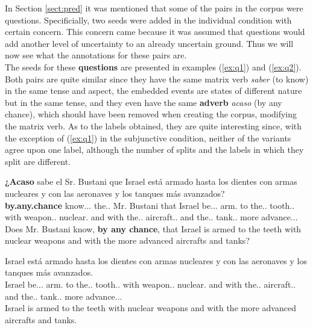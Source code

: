 In Section \ref{sect:pred} it was mentioned that some of the pairs in the corpus were questions. Specificially, two seeds were added in the individual condition with certain concern. This concern came because it was assumed that questions would add another level of uncertainty to an already uncertain ground. Thus we will now see what the annotations for these pairs are.\\ 

The seeds for these \textbf{questions} are presented in examples (\ref{ex:q1}) and (\ref{ex:q2}). Both pairs are quite similar since they have the same matrix verb \textit{saber} (to know) in the same tense and aspect, the embedded events are states of different nature but in the same tense, and they even have the same \textbf{adverb} \textit{acaso} (by any chance), which should have been removed when creating the corpus, modifying the matrix verb. As to the labels obtained, they are quite interesting since, with the exception of (\ref{ex:q1}) in the subjunctive condition, neither of the variants agree upon one label, although the number of splits and the labels in which they split are different.\\

\begin{exe}
  \ex\label{ex:q1}
    \begin{xlist}
      \item{\gll \textbf{¿Acaso} sabe el Sr. Bustani que Israel está armado hasta los dientes con armas nucleares y con las aeronaves y los tanques más avanzados?\\ \textbf{by.any.chance} know.\Prs.\Ind.\Tsg{} the.\M.\Sg{} Mr. Bustani that Israel be.\Prs.\Ind.\Tsg{} arm.\Ptcp{} to the.\M.\Pl{} tooth.\M.\Pl{} with weapon.\F.\Sg{} nuclear.\Pl{} and with the.\F.\Pl{} aircraft.\F.\Pl{} and the.\M.\Pl{} tank.\M.\Pl{} more advance.\Ptcp.\M.\Pl{} \\\glt Does Mr. Bustani know, \textbf{by any chance}, that Israel is armed to the teeth with nuclear weapons and with the more advanced aircrafts and tanks?}
      \item{\gll Israel está armado hasta los dientes con armas nucleares y con las aeronaves y los tanques más avanzados.\\ Israel be.\Prs.\Ind.\Tsg{} arm.\Ptcp{} to the.\M.\Pl{} tooth.\M.\Pl{} with weapon.\F.\Sg{} nuclear.\Pl{} and with the.\F.\Pl{} aircraft.\F.\Pl{} and the.\M.\Pl{} tank.\M.\Pl{} more advance.\Ptcp.\M.\Pl{}\\\glt Israel is armed to the teeth with nuclear weapons and with the more advanced aircrafts and tanks.} \label{ex:hypq1}
    \end{xlist}
\end{exe}

